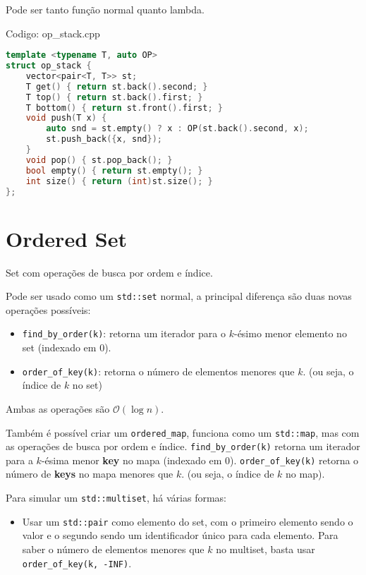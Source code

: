 \documentclass[10pt, a4paper, oneside]{book}
\begin{document}
Pode ser tanto função normal quanto lambda.
\hfill

Codigo: op\_stack.cpp

\begin{lstlisting}[language=C++]
template <typename T, auto OP>
struct op_stack {
    vector<pair<T, T>> st;
    T get() { return st.back().second; }
    T top() { return st.back().first; }
    T bottom() { return st.front().first; }
    void push(T x) {
        auto snd = st.empty() ? x : OP(st.back().second, x);
        st.push_back({x, snd});
    }
    void pop() { st.pop_back(); }
    bool empty() { return st.empty(); }
    int size() { return (int)st.size(); }
};\end{lstlisting}
\hfill

\section{Ordered Set}


Set com operações de busca por ordem e índice.



Pode ser usado como um \texttt{std::set} normal, a principal diferença são duas novas operações possíveis:



\begin{itemize}
\item \texttt{find\_by\_order(k)}: retorna um iterador para o $k$-ésimo menor elemento no set (indexado em 0).
\item \texttt{order\_of\_key(k)}: retorna o número de elementos menores que $k$. (ou seja, o índice de $k$ no set)
\end{itemize}



Ambas as operações são $\mathcal{O}(\log n)$.



Também é possível criar um \texttt{ordered\_map}, funciona como um \texttt{std::map}, mas com as operações de busca por ordem e índice. \texttt{find\_by\_order(k)} retorna um iterador para a $k$-ésima menor \textbf{key} no mapa (indexado em 0). \texttt{order\_of\_key(k)} retorna o número de \textbf{keys} no mapa menores que $k$. (ou seja, o índice de $k$ no map).



Para simular um \texttt{std::multiset}, há várias formas:



\begin{itemize}
\item Usar um \texttt{std::pair} como elemento do set, com o primeiro elemento sendo o valor e o segundo sendo um identificador único para cada elemento. Para saber o número de elementos menores que $k$ no multiset, basta usar \texttt{order\_of\_key({k, -INF})}.
\end{itemize}
\end{document}
